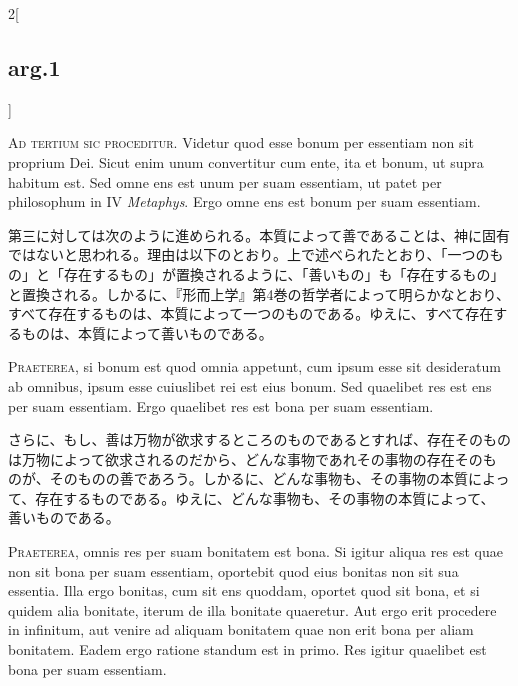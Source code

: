 \documentclass[paper=a4paper,fontsize=10pt,jafontsize=9pt,titlepage]{jlreq}
\begin{document}
{}
\setcounter{section}{3}
\setcounter{subsection}{0}

\begin{paracol}{2}[\subsection{arg.1}]

{\huge A}{\scshape d tertium sic proceditur}. Videtur quod esse bonum
per essentiam non sit proprium Dei. Sicut enim unum convertitur cum
ente, ita et bonum, ut supra habitum est. Sed omne ens est unum per suam
essentiam, ut patet per philosophum in IV {\itshape Metaphys}. Ergo omne
ens est bonum per suam essentiam.

\switchcolumn

第三に対しては次のように進められる。本質によって善であることは、神に固有
ではないと思われる。理由は以下のとおり。上で述べられたとおり、「一つのも
の」と「存在するもの」が置換されるように、「善いもの」も「存在するもの」
と置換される。しかるに、『形而上学』第4巻の哲学者によって明らかなとおり、
すべて存在するものは、本質によって一つのものである。ゆえに、すべて存在す
るものは、本質によって善いものである。


{\scshape Praeterea}, si bonum est quod omnia appetunt, cum ipsum esse sit
desideratum ab omnibus, ipsum esse cuiuslibet rei est eius bonum. Sed
quaelibet res est ens per suam essentiam. Ergo quaelibet res est bona
per suam essentiam.

\switchcolumn

さらに、もし、善は万物が欲求するところのものであるとすれば、存在そのもの
 は万物によって欲求されるのだから、どんな事物であれその事物の存在そのも
 のが、そのものの善であろう。しかるに、どんな事物も、その事物の本質によっ
 て、存在するものである。ゆえに、どんな事物も、その事物の本質によって、
 善いものである。


{\scshape Praeterea}, omnis res per suam bonitatem est bona. Si igitur
aliqua res est quae non sit bona per suam essentiam, oportebit quod eius
bonitas non sit sua essentia. Illa ergo bonitas, cum sit ens quoddam,
oportet quod sit bona, et si quidem alia bonitate, iterum de illa
bonitate quaeretur. Aut ergo erit procedere in infinitum, aut venire ad
aliquam bonitatem quae non erit bona per aliam bonitatem. Eadem ergo
ratione standum est in primo. Res igitur quaelibet est bona per suam
essentiam.


\end{paracol}
\end{document}
